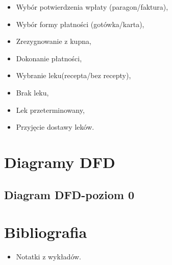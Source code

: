 \documentclass[a4paper, 11pt]{article}
\begin{document}
	\begin{itemize}
	\item Wybór potwierdzenia wpłaty (paragon/faktura),
	\item Wybór formy płatności (gotówka/karta),
	\item Zrezygnowanie z kupna,
	\item Dokonanie płatności,
	\item Wybranie leku(recepta/bez recepty),
	\item Brak leku,
	\item Lek przeterminowany,
	\item Przyjęcie dostawy leków.
	\end{itemize}
	

	\section{Diagramy DFD}
	\subsection{Diagram DFD-poziom 0}
	
	
	
	
	
	\section{Bibliografia}
	\begin{itemize}
	\item Notatki z wykładów.
	\end{itemize}
	
\end{document}
